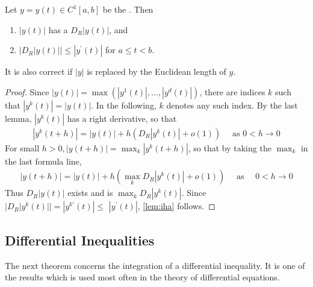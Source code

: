 \documentclass{article}
\begin{document}
\begin{lema}\label{lem:iha}
Let $y=y(t) \in C^{1}[a, b]$ be the . Then 
\begin{enumerate}
    \item $|y(t)|$ has a  $D_{R}|y(t)|$, and 
    \item $\big|D_{R}| y(t)|\big| \le\left|y^{\prime}(t)\right|$ for $a \le t<b$.
\end{enumerate}
\end{lema}
\begin{rema}
It is also correct if $|y|$ is replaced by the Euclidean length of $y$.
\end{rema}
\begin{proof}
Since $|y(t)|=\max \left(\left|y^{1}(t)\right|, \ldots,\left|y^{d}(t)\right|\right)$, there are indices $k$ such that $\left|y^{k}(t)\right|=|y(t)|$. In the following, $k$ denotes any such index. By the last lemma, $\left|y^{k}(t)\right|$ has a right derivative, so that
\begin{align*}
\left|y^{k}(t+h)\right|=|y(t)|+h\left(D_{R}\left|y^{k}(t)\right|+o(1)\right) \quad \text { as } 0<h \rightarrow 0
\end{align*}
For small $h>0,|y(t+h)|=\max _{k}\left|y^{k}(t+h)\right|$, so that by taking the $\max _{k}$ in the last formula line,
\begin{align*}
|y(t+h)|=|y(t)|+h\left(\max _{k} D_{R}\left|y^{k}(t)\right|+o(1)\right) \quad \text { as } \quad 0<h \rightarrow 0
\end{align*}
Thus $D_{R}|y(t)|$ exists and is $\max _{k} D_{R}\left|y^{k}(t)\right| .$ Since $\left|D_{R}\right| y^{k}(t)||=\left|y^{k \prime}(t)\right| \le$ $\left|y^{\prime}(t)\right|$, \cref{lem:iha} follows.
\end{proof}

\subsection{Differential Inequalities}
The next theorem concerns the integration of a differential inequality. It is one of the results which is used most often in the theory of differential equations.
\end{document}
